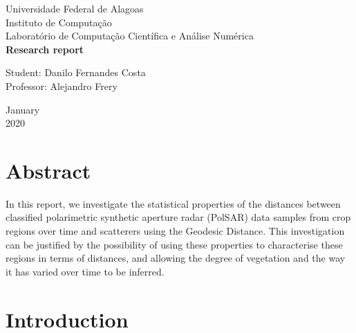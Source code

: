 \documentclass[12pt]{article}
\begin{document}

\onehalfspacing

\begin{titlepage}
\begin{center}

\Huge{Universidade Federal de Alagoas}\\
\large{Instituto de Computação}\\ 
\large{Laboratório de Computação Científica e Análise Numérica}\\ 
\vspace{220pt}
\textbf{\LARGE{Research report}}\\
\vspace{3,5cm}
\end{center}

\begin{flushleft}
\begin{tabbing}
Student: Danilo Fernandes Costa\\
Professor: Alejandro Frery\\
\end{tabbing}
\end{flushleft}
\vspace{1cm}

\begin{center}
\vspace{\fill}
January\\
2020
\end{center}
\end{titlepage}

\section*{\centering Abstract}

In this report, we investigate the statistical properties of the distances between classified polarimetric synthetic aperture radar (PolSAR) data samples from crop regions over time and scatterers using the Geodesic Distance. This investigation can be justified by the possibility of using these properties to characterise these regions in terms of distances, and allowing the degree of vegetation and the way it has varied over time to be inferred.

\section{Introduction}
\end{document}

